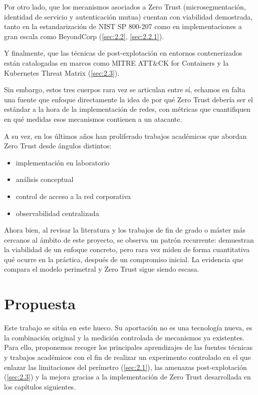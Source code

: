 \documentclass[11pt,spanish,listoffigures,listoftables]{tfgetsinf}
\begin{document}
    Por otro lado, que los mecanismos asociados a Zero Trust (microsegmentación, identidad de servicio y autenticación mutua) cuentan con viabilidad demostrada, tanto en la estandarización de NIST SP 800-207 como en implementaciones a gran escala como BeyondCorp (\cref{sec:2.2}, \cref{sec:2.2.1}).
    
    Y finalmente, que las técnicas de post-explotación en entornos contenerizados están catalogadas en marcos como MITRE ATT\&CK for Containers y la Kubernetes Threat Matrix (\cref{sec:2.3}). 
    
    Sin embargo, estos tres cuerpos rara vez se articulan entre sí, echamos en falta una fuente que enfoque directamente la idea de por qué Zero Trust debería ser el estándar a la hora de la implementación de redes, con métricas que cuantifiquen en qué medidas esos mecanismos contienen a un atacante.
    
    A su vez, en los últimos años han proliferado trabajos académicos que abordan Zero Trust desde ángulos distintos: 
    \begin{itemize}
        \item implementación en laboratorio
        \item análisis conceptual
        \item control de acceso a la red corporativa
        \item observabilidad centralizada
    \end{itemize}
    
    Ahora bien, al revisar la literatura y los trabajos de fin de grado o máster más cercanos al ámbito de este proyecto, se observa un patrón recurrente: demuestran la viabilidad de un enfoque concreto, pero rara vez miden de forma cuantitativa qué ocurre en la práctica, después de un compromiso inicial. La evidencia que compara el modelo perimetral y Zero Trust sigue siendo escasa.
    
    \section{Propuesta}
    Este trabajo se sitúa en este hueco. Su aportación no es una tecnología nueva, es la combinación original y la medición controlada de mecanismos ya existentes. Para ello, proponemos recoger los principales aprendizajes de las fuentes técnicas y trabajos académicos con el fin de realizar un experimento controlado en el que enlazar las limitaciones del perímetro (\cref{sec:2.1}), las amenazas post-explotación (\cref{sec:2.3}) y la mejora gracias a la implementación de Zero Trust desarrollada en los capítulos siguientes.
\end{document}
